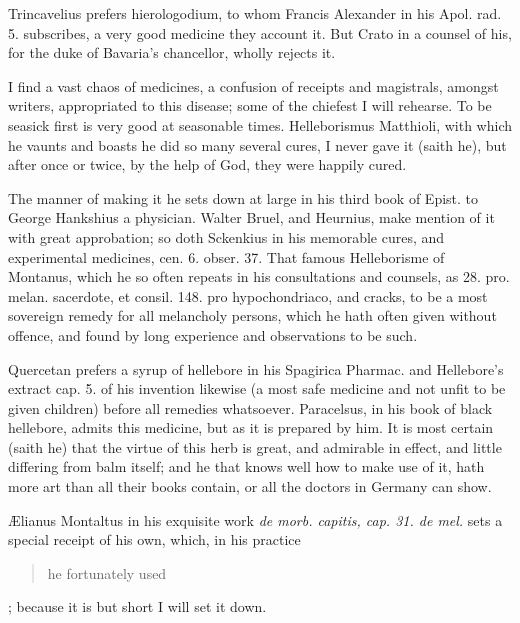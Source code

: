 Trincavelius prefers hierologodium, to whom Francis Alexander in
his Apol. rad. 5. subscribes, a very good medicine they account it. But
Crato in a counsel of his, for the duke of Bavaria's chancellor, wholly
rejects it.

I find a vast chaos of medicines, a confusion of receipts and
magistrals, amongst writers, appropriated to this disease; some of the
chiefest I will rehearse. To be seasick first is very good at
seasonable times. Helleborismus Matthioli, with which he vaunts and
boasts he did so many several cures, I never gave it (saith he),
but after once or twice, by the help of God, they were happily cured.

The manner of making it he sets down at large in his third book of
Epist. to George Hankshius a physician. Walter Bruel, and Heurnius,
make mention of it with great approbation; so doth Sckenkius in his
memorable cures, and experimental medicines, cen. 6. obser. 37. That
famous Helleborisme of Montanus, which he so often repeats in his
consultations and counsels, as 28. pro. melan. sacerdote, et consil.
148. pro hypochondriaco, and cracks,  to be a most sovereign
remedy for all melancholy persons, which he hath often given without
offence, and found by long experience and observations to be such.

Quercetan prefers a syrup of hellebore in his Spagirica Pharmac. and
Hellebore's extract cap. 5. of his invention likewise (a most safe
medicine and not unfit to be given children) before all remedies
whatsoever. 
Paracelsus, in his book of black hellebore, admits this medicine, but
as it is prepared by him. It is most certain (saith he) that the
virtue of this herb is great, and admirable in effect, and little
differing from balm itself; and he that knows well how to make use of
it, hath more art than all their books contain, or all the doctors in
Germany can show.

\AE{}lianus Montaltus in his exquisite work \emph{de morb. capitis, cap. 31. de
mel.} sets a special receipt of his own, which, in his practice \blockquote{he
fortunately used}; because it is but short I will set it down.

